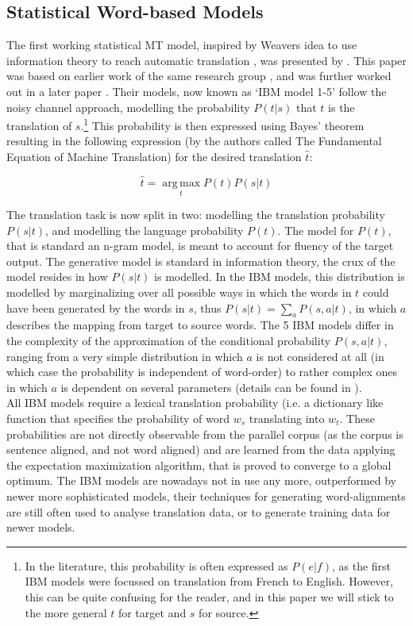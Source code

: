 \documentclass{report}
\theoremstyle{definition}
\theoremstyle{plain}
\begin{document}
\subsection{Statistical Word-based Models}

The first working statistical MT model, inspired by  Weavers idea to use information theory to reach automatic translation \citep{weaver1955translation}, was presented by \cite{brown1990statistical}. This paper was based on earlier work of the same research group \citep{brown1988statistical}, and was further worked out in a later paper \citep{brown1993mathematics}. Their models, now known as `IBM model 1-5' follow the noisy channel approach, modelling the probability $P(t|s)$ that $t$ is the translation of $s$.\footnote{In the literature, this probability is often expressed as $P(e|f)$, as the first IBM models were focussed on translation from French to English. However, this can be quite confusing for the reader, and in this paper we will stick to the more general $t$ for target and $s$ for source.} This probability is then expressed using Bayes' theorem resulting in the following expression (by the authors called The Fundamental Equation of Machine Translation) for the desired translation $\hat{t}$:

\[
\hat{t} = \operatorname*{arg\,max}_t P(t)P(s|t)
\]

The translation task is now split in two: modelling the translation probability $P(s|t)$, and modelling the language probability $P(t)$. The model for $P(t)$, that is standard an n-gram model, is meant to account for fluency of the target output. The generative model is standard in information theory, the crux of the model resides in how $P(s|t)$ is modelled. In the IBM models, this distribution is modelled by marginalizing over all possible ways in which the words in $t$ could have been generated by the words in $s$, thus $P(s|t) = \sum_a P(s,a|t)$, in which $a$ describes the mapping from target to source words. The 5 IBM models differ in the complexity of the approximation of the conditional probability $P(s,a|t)$, ranging from a very simple distribution in which $a$ is not considered at all (in which case the probability is independent of word-order) to rather complex ones in which $a$ is dependent on several parameters (details can be found in \cite{brown1993mathematics}).\\
All IBM models require a lexical translation probability (i.e. a dictionary like function that specifies the probability of word $w_s$ translating into $w_t$. These probabilities are not directly observable from the parallel corpus (as the corpus is sentence aligned, and not word aligned) and are learned from the data applying the expectation maximization algorithm, that is proved to converge to a global optimum. The IBM models are nowadays not in use any more, outperformed by newer more sophisticated models, their techniques for generating word-alignments are still often used to analyse translation data, or to generate training data for newer models.
\end{document}
